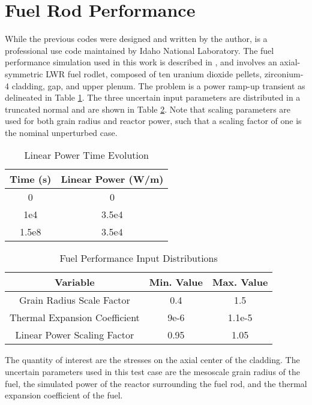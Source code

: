 \section{Fuel Rod Performance}
While the previous codes were designed and written by the author, \bison{} is a professional use code
maintained by Idaho National Laboratory.  The fuel performance simulation used in this work is described
in \cite{cristiansmeared},
and involves an axial-symmetric LWR fuel rodlet, composed of ten uranium dioxide pellets, zirconium-4
cladding, gap, and upper plenum.  The problem is a power ramp-up transient as delineated in Table
\ref{tab:bison power ramp}.  The three uncertain input parameters are distributed in a truncated normal and
are shown in Table \ref{tab:bison dists}.  Note that scaling parameters are used for both grain radius and
reactor power, such that a scaling factor of one is the nominal unperturbed case.
\begin{table}[h]
  \centering
  \begin{tabular}{c|c}
    Time (s) & Linear Power (W/m) \\ \hline
    0 & 0 \\
    1e4 & 3.5e4 \\
    1.5e8 & 3.5e4
  \end{tabular}
  \caption{Linear Power Time Evolution}
  \label{tab:bison power ramp}
\end{table}
\begin{table}[h]
  \centering
  \begin{tabular}{c|c|c}
    Variable & Min. Value & Max. Value \\ \hline
    Grain Radius Scale Factor & 0.4 & 1.5 \\
    Thermal Expansion Coefficient & 9e-6 & 1.1e-5 \\
    Linear Power Scaling Factor & 0.95 & 1.05
  \end{tabular}
  \caption{Fuel Performance Input Distributions}
  \label{tab:bison dists}
\end{table}

The quantity of interest are the stresses on the axial center of the cladding.  The
uncertain parameters used in this test case are the mesoscale grain radius of the fuel, the simulated power
of the reactor surrounding the fuel rod, and the thermal expansion coefficient of the fuel.
